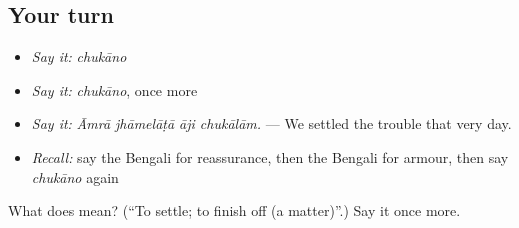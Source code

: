 \subsection*{Your turn}
\begin{itemize}
\raggedright
  \item \emph{Say it:} \emph{chukāno}
  \item \emph{Say it:} \emph{chukāno}, once more
  \item \emph{Say it:} \emph{Āmrā jhāmelāṭā āji chukālām.} — We settled the trouble that very day.
  \item \emph{Recall:} say the Bengali for reassurance, then the Bengali for armour, then say \emph{chukāno} again
\end{itemize}

\begin{tcolorbox}[breakable,colback=teal!4,colframe=teal!35!black,title={Before you move on}]
What does  mean? (\textquotedblleft{}To settle; to finish off (a matter)\textquotedblright{}.) Say it once more.
\end{tcolorbox}
